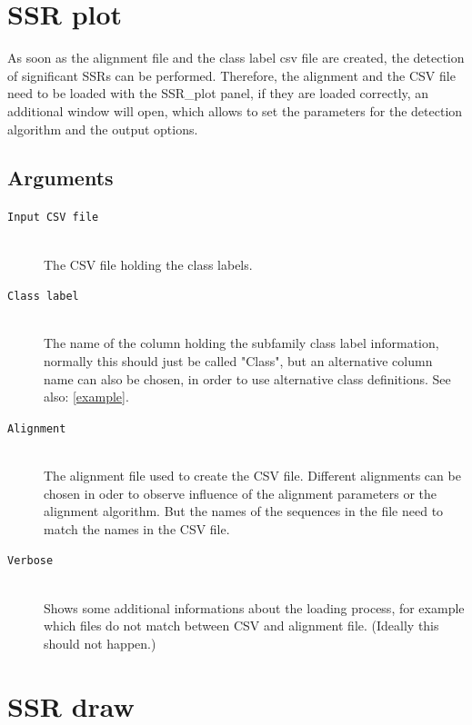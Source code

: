 \documentclass[a4paper,10pt]{article}
\begin{document}
\section{SSR plot} \label{ssr_p}

As soon as the alignment file and the class label csv file are created, the detection of
significant SSRs can be performed. 
Therefore, the alignment and the CSV file need to be loaded with the SSR\_plot panel,
if they are loaded correctly, an additional window will open, which allows to set the parameters 
for the detection algorithm and the output options.

\subsection{Arguments}

\begin{description}

\item[\texttt{Input CSV file}] \hfill \\
 
The CSV file holding the class labels. 

\item[\texttt{Class label}] \hfill \\
 
The name of the column holding the subfamily class label information, normally this should just be called "Class",
but an alternative column name can also be chosen, in order to use alternative class definitions. See also:
\ref{example}.

\item[\texttt{Alignment}] \hfill \\

The alignment file used to create the CSV file. Different alignments can be chosen in oder to 
observe influence of the alignment parameters or the alignment algorithm. But the names of the sequences in 
the file need to match the names in the CSV file.

\item[\texttt{Verbose}] \hfill \\

Shows some additional informations about the loading process, for example which files do not match between CSV and alignment file.
(Ideally this should not happen.)

\end{description}

\section{SSR draw} \label{ssr_p}
\end{document}
